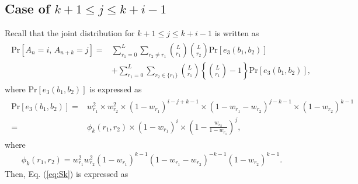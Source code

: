 \subsection{Case of $k+1 \leq j \leq k+i-1$}
Recall that the joint distribution for $k+1 \leq j \leq k+i-1$ is written as
\begin{align}\begin{split}
	\mathrm{Pr}[A_n=i,\, A_{n+k}=j] 
	=& \sum_{r_1=0}^{L} \sum_{r_2 \neq r_1} \binom{L}{r_1}\binom{L}{r_2}\mathrm{Pr}[e_3(b_1,b_2)] \\
	&+ \sum_{r_1=0}^{L} \sum_{r_2 \in \{r_1\}} \binom{L}{r_1}\left\{\binom{L}{r_1}-1\right\}\mathrm{Pr}[e_3(b_1,b_2)],
\end{split}\end{align}
where $\mathrm{Pr}[e_3(b_1,b_2)]$ is expressed as
\begin{align}\begin{split}
	\mathrm{Pr}[e_3(b_1,b_2)]
 	=& w_{r_1}^2  \times w_{r_2}^2 
  \times (1-w_{r_1})^{i-j+k-1} 
  \times (1-w_{r_1}-w_{r_2})^{j-k-1}
  \times (1-w_{r_2})^{k-1} \\
  =&\phi_k(r_1,r_2)\times (1-w_{r_1})^{i} \times \left(1-\frac{w_{r_2}}{1-w_{r_1}} \right)^{j},
\end{split}\end{align}
%
where
\begin{align}\label{eq:phi_k}
	\phi_k(r_1,r_2) = w_{r_1}^2 w_{r_2}^2 
  	(1-w_{r_1})^{k-1} 
  	(1-w_{r_1}-w_{r_2})^{-k-1}
  	(1-w_{r_2})^{k-1}.
\end{align}
%
Then, Eq. (\ref{eq:Sk}) is expressed as
